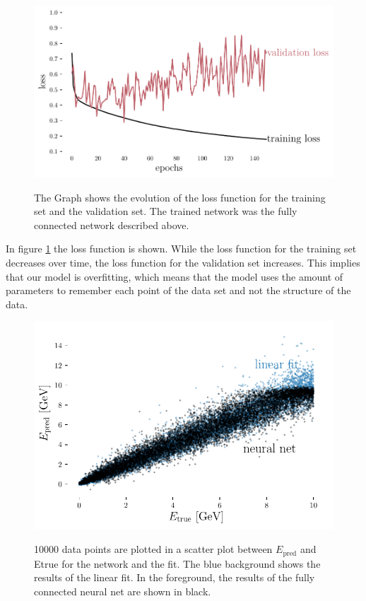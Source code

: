\documentclass[12pt, a4paper]{thesis}
\begin{document}
\begin{figure}[htbp]
\centering
\includegraphics[width=.9\linewidth]{../images/dense_loss.pdf}
\label{dense_loss}
\caption{The Graph shows the evolution of the loss function for the
  training set and the validation set. The trained network was the
  fully connected network described above.}
\end{figure}

In figure \ref{dense_loss} the loss function is shown. While the loss
function for the training set decreases over time, the loss function for the
validation set increases. This implies that our model is overfitting,
which means that the model uses the amount of parameters to remember
each point of the data set and not the structure of the data.

\begin{figure}[htbp]
\centering
\includegraphics[width=.9\linewidth]{../images/dense_scatter.pdf}
\label{dense_scatter}
\caption{ 10000 data points are plotted in a scatter plot between
  \(E_\text{pred}\) and Etrue for the network and the fit. The blue
  background shows the results of the linear fit. In the foreground,
  the results of the fully connected neural net are shown in black.}
\end{figure} 
\end{document}
